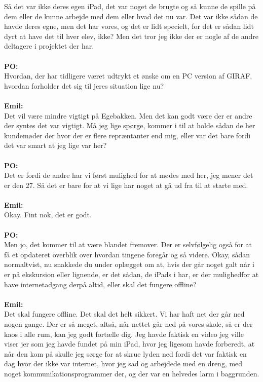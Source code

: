 Så det var ikke deres egen iPad, det var noget de brugte og så kunne de spille på dem eller de kunne arbejde med dem eller hvad det nu var.   
Det var ikke sådan de havde deres egne, men det har vores, og det er lidt specielt, for det er sådan lidt dyrt at have det til hver elev, ikke?
Men det tror jeg ikke der er nogle af de andre deltagere i projektet der har.
\\\\
\textbf{PO:}\\
Hvordan, der har tidligere været udtrykt et ønske om en PC version af GIRAF, hvordan forholder det sig til jeres situation lige nu?
\\\\
\textbf{Emil:}\\
Det vil være mindre vigtigt på Egebakken.
Men det kan godt være der er andre der syntes det var vigtigt.
Må jeg lige spørge, kommer i til at holde sådan de her kundemøder der hvor der er flere repræntanter end mig, eller var det bare fordi det var smart at jeg lige var her?
\\\\
\textbf{PO:}\\
Det er fordi de andre har vi først mulighed for at mødes med her, jeg mener det er den 27. 
Så det er bare for at vi lige har noget at gå ud fra til at starte med.
\\\\
\textbf{Emil:}\\
Okay.
Fint nok, det er godt.
\\\\
\textbf{PO:}\\
Men jo, det kommer til at være blandet fremover.
Der er selvfølgelig også for at få et opdateret overblik over hvordan tingene foregår og så videre.
Okay, sådan normaltvist, nu snakkede du under oplægget om at, hvis der går noget galt når i er på ekskursion eller lignende, er det sådan, de iPads i har, er der mulighedfor at have internetadgang derpå altid, eller skal det fungere offline?
\\\\
\textbf{Emil:}\\
Det skal fungere offline.
Det skal det helt sikkert.
Vi har haft net der går ned nogen gange. 
Der er så meget, altså, når nettet går ned på vores skole, så er der kaos i alle rum, kan jeg godt fortælle dig.
Jeg havde faktisk en video jeg ville viser jer som jeg havde fundet på min iPad, hvor jeg ligesom havde forberedt, at når den kom på skulle jeg sørge for at skrue lyden ned fordi det var faktisk en dag hvor der ikke var internet, hvor jeg sad og arbejdede med en dreng, med noget kommunikationsprogrammer der, og der var en helvedes larm i baggrunden. 
